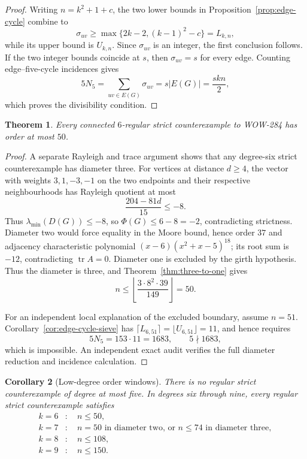 \documentclass[a4paper,10pt,reqno]{amsart}
\theoremstyle{plain}
\newtheorem{theorem}{Theorem}[section]
\newtheorem{corollary}[theorem]{Corollary}
\theoremstyle{definition}
\theoremstyle{remark}
\newcommand{\tr}{\operatorname{tr}}
\begin{document}
\begin{proof}
Writing \(n=k^2+1+c\), the two lower bounds in
Proposition~\ref{prop:edge-cycle} combine to
\[
 \sigma_{uv}\ge
 \max\{2k-2,(k-1)^2-c\}=L_{k,n},
\]
while its upper bound is \(U_{k,n}\).  Since \(\sigma_{uv}\) is an integer,
the first conclusion follows.  If the two integer bounds coincide at \(s\),
then \(\sigma_{uv}=s\) for every edge.  Counting edge--five-cycle incidences
gives
\[
 5N_5=\sum_{uv\in E(G)}\sigma_{uv}
 =s|E(G)|=\frac{skn}{2},
\]
which proves the divisibility condition.
\end{proof}

\begin{theorem}\label{thm:degree-six-fifty}
Every connected \(6\)-regular strict counterexample to WOW-284 has order at
most \(50\).
\end{theorem}

\begin{proof}
A separate Rayleigh and trace argument shows that any degree-six strict
counterexample has diameter three.  For vertices at distance \(d\ge4\), the
vector with weights \(3,1,-3,-1\) on the two endpoints and their respective
neighbourhoods has Rayleigh quotient at most
\[
 \frac{204-81d}{15}\le-8.
\]
Thus \(\lambda_{\min}(D(G))\le-8\), so
\(\Phi(G)\le6-8=-2\), contradicting strictness.  Diameter two would force equality in the
Moore bound, hence order \(37\) and adjacency characteristic polynomial
\((x-6)(x^2+x-5)^{18}\); its root sum is \(-12\), contradicting
\(\tr A=0\).  Diameter one is excluded by the girth hypothesis.  Thus the
diameter is three, and
 Theorem~\ref{thm:three-to-one} gives
\[
 n\le\left\lfloor\frac{3\cdot8^2\cdot39}{149}\right\rfloor=50.
\]

For an independent local explanation of the excluded boundary, assume
\(n=51\).  Corollary~\ref{cor:edge-cycle-sieve} has
\(\lceil L_{6,51}\rceil=\lfloor U_{6,51}\rfloor=11\), and hence requires
\[
 5N_5=153\cdot11=1683,
 \qquad 5\nmid 1683,
\]
which is impossible.  An independent exact audit verifies the full diameter
reduction and incidence calculation.
\end{proof}

\begin{corollary}[Low-degree order windows]\label{cor:low-degree-windows}
There is no regular strict counterexample of degree at most five.  In degrees
six through nine, every regular strict counterexample satisfies
\begin{align*}
k=6&:\quad n\le50,\\
k=7&:\quad n=50\text{ in diameter two, or }n\le74\text{ in diameter three},\\
k=8&:\quad n\le108,\\
k=9&:\quad n\le150.
\end{align*}
\end{corollary}
\end{document}
